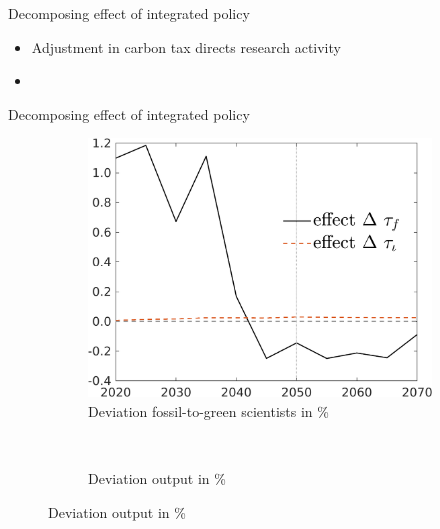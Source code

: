 \documentclass[11pt,aspectratio=169]{beamer}
\begin{document}
\begin{frame}{Decomposing effect of integrated policy }
\begin{figure}
\begin{subfigure}{0.45\textwidth}
		\end{subfigure}
	\end{figure}
	\vspace{3mm}
	\begin{block}{}
		\begin{itemize}
			\item Adjustment in carbon tax directs research activity 
			\item[] %
		\end{itemize}
	\end{block}	
\end{frame}

\addtocounter{framenumber}{-1}
\begin{frame}{Decomposing effect of integrated policy}
	\hypertarget{mec0}{}
	\vspace{-3mm}
	\centering
	\begin{figure}
		\begin{subfigure}{0.45\textwidth}
			\caption{{Deviation fossil-to-green scientists in \% }}
			\includegraphics[width=1\textwidth]{../codding_model/own_basedOnFried/optimalPol_010922_revision/figures/all_13Sept22/NewCalib_polTaulFixedTaufJointPer_sffsg_Sun2_emnet1_spillover0_knspil3_xgr0_nsk0_sep0_extern0_PV1_etaa0.79_lgd1.png}
		\end{subfigure}
		\begin{minipage}[]{0.05\textwidth}
			\
		\end{minipage}
		\begin{subfigure}{0.45\textwidth}
			\caption{{Deviation output in \%}}

\end{subfigure}
\end{figure}
\end{frame}
\end{document}
